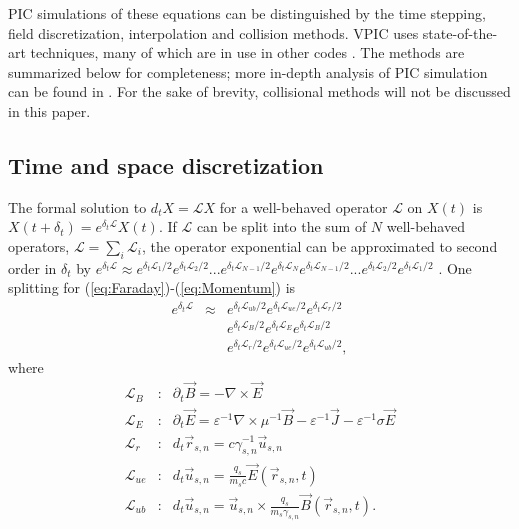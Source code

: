 \documentclass[aps,prl,preprint,preprintnumbers,groupedaddress]{revtex4}
\newcommand{\eps}{\varepsilon}
\newcommand{\vecr}{\vec{r}}
\newcommand{\vecu}{\vec{u}}
\newcommand{\vecJ}{\vec{J}}
\newcommand{\vecE}{\vec{E}}
\newcommand{\vecB}{\vec{B}}
\newcommand{\op}{\mathcal{L}}
\newcommand{\Deriv}[2]{d_{#2}#1}
\newcommand{\PDeriv}[2]{\partial_{#2}#1}
\newcommand{\CrossP}[2]{#1 \times #2}
\newcommand{\Curl}[1]{\nabla \times #1}
\newcommand{\eq}[1]{(\ref{eq:#1})}
\begin{document}
PIC simulations of these equations can be distinguished by the time
stepping, field discretization, interpolation and collision methods.
VPIC uses state-of-the-art techniques, many of which are in use in
other codes
\cite{Kwan_Snell_1985,Verboncoeur_et_al_1995,Eastwood_et_al_1995,Jones_et_al_1996,Blahovec_et_al_2000,Nieter_Cary_2004}.
The methods are summarized below for completeness; more in-depth
analysis of PIC simulation can be found in
\cite{Birdsall_Langdon_1985,Hockney_Eastwood_1988}.  For the sake of
brevity, collisional methods will not be discussed in this paper.

\subsection{Time and space discretization}

The formal solution to $\Deriv{X}{t} = \op X$ for a well-behaved
operator $\op$ on $X\left(t\right)$ is $X\left(t+\delta_t\right) =
e^{\delta_t\op} X\left(t\right)$.  If $\op$ can be split into the sum
of $N$ well-behaved operators, $\op = \sum_i \op_i$, the operator
exponential can be approximated to second order in $\delta_t$ by
$e^{\delta_t\op} \approx e^{\delta_t\op_1/2} e^{\delta_t\op_2/2} ...
e^{\delta_t\op_{N-1}/2} e^{\delta_t\op_N} e^{\delta_t\op_{N-1}/2} ...
e^{\delta_t\op_2/2} e^{\delta_t\op_1/2}$
\cite{McLachlan_Quispel_2002}.  One splitting for
\eq{Faraday}-\eq{Momentum} is
\begin{eqnarray}
e^{\delta_t\op}&\approx& e^{\delta_t\op_{ub}/2} e^{\delta_t\op_{ue}/2}
e^{\delta_t\op_r/2} \nonumber\\
& & e^{\delta_t\op_B/2}e^{\delta_t\op_E} e^{\delta_t\op_B/2} \nonumber\\
& & e^{\delta_t\op_r/2} e^{\delta_t\op_{ue}/2} e^{\delta_t\op_{ub}/2}
,
\label{eq:Operator_Split}
\end{eqnarray}
where
\begin{eqnarray}
\op_B    &:& \PDeriv{\vecB}{t} = -\Curl{\vecE} \\
\op_E    &:& \PDeriv{\vecE}{t} =
\eps^{-1}\Curl{\mu^{-1}\vecB} - \eps^{-1}\vecJ - \eps^{-1}\sigma\vecE \\
\op_{r}  &:& \Deriv{\vecr_{s,n}}{t} = c\gamma_{s,n}^{-1}\vecu_{s,n} \\
\op_{ue} &:& \Deriv{\vecu_{s,n}}{t} =
\frac{q_s}{m_s c} \vecE\left(\vecr_{s,n},t\right) \\
\op_{ub} &:& \Deriv{\vecu_{s,n}}{t} = \CrossP{\vecu_{s,n}}
{\frac{q_s}{m_s\gamma_{s,n}}\vecB\left(\vecr_{s,n},t\right)}
.
\end{eqnarray}
\end{document}
